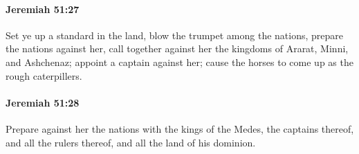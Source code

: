 		\paragraph{Jeremiah 51:27} %
			\label{JEREMIAH-51-27}

			Set ye up a standard in the land, blow the trumpet among the nations, prepare the nations against her, call together against her the kingdoms of Ararat, Minni, and Ashchenaz; appoint a captain against her; cause the horses to come up as the rough caterpillers.


		\paragraph{Jeremiah 51:28} %
			\label{JEREMIAH-51-28}

			Prepare against her the nations with the kings of the Medes, the captains thereof, and all the rulers thereof, and all the land of his dominion.

